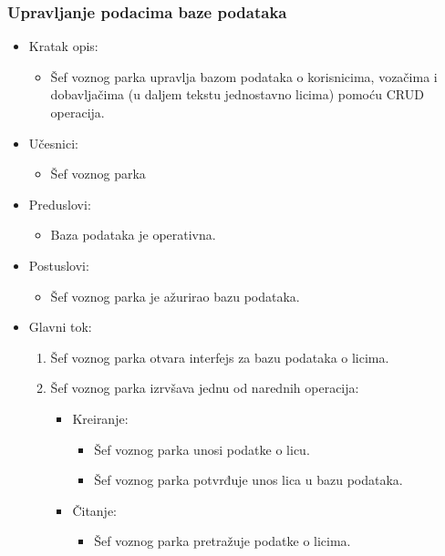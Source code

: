\newpage

\subsubsection{\bfseries Upravljanje podacima baze podataka}

\begin{itemize}
	\item Kratak opis:
		\begin{itemize}
			\item Šef voznog parka upravlja bazom podataka o korisnicima, vozačima i dobavljačima (u daljem tekstu jednostavno licima) pomoću CRUD operacija.
		\end{itemize}
	\item Učesnici:
		\begin{itemize}
		    \item Šef voznog parka
		\end{itemize}
	\item Preduslovi:
		\begin{itemize}
		    \item Baza podataka je operativna.
		\end{itemize}
	\item Postuslovi:
		\begin{itemize}
			\item Šef voznog parka je ažurirao bazu podataka.
	    \end{itemize}
	\item Glavni tok:
		\begin{enumerate}
		    \item Šef voznog parka otvara interfejs za bazu podataka o licima.
			\item Šef voznog parka izrvšava jednu od narednih operacija:
			\begin{itemize}
                \item Kreiranje:
                \begin{itemize}
                    \item Šef voznog parka unosi podatke o licu.
                    \item Šef voznog parka potvrđuje unos lica u bazu podataka.
                \end{itemize}
                \item Čitanje:
                \begin{itemize}
                    \item Šef voznog parka pretražuje podatke o licima.
                \end{itemize}

\end{itemize}
\end{enumerate}
\end{itemize}
